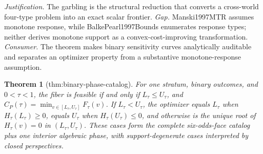 \documentclass{article}
\newtheorem{theorem}{Theorem}
\begin{document}
\par\smallskip\noindent \textit{Justification.} The garbling is the structural reduction that converts a cross-world four-type problem into an exact scalar frontier. \textit{Gap.} Manski1997MTR assumes monotone response, while BalkePearl1997Bounds enumerates response types; neither derives monotone support as a convex-cost-improving transformation. \textit{Consumer.} The theorem makes binary sensitivity curves analytically auditable and separates an optimizer property from a substantive monotone-response assumption.

\begin{theorem}[thm:binary-phase-catalog]\label{thm:binary-phase-catalog}
For one stratum, binary outcomes, and \(0<\tau<1\), the fiber is feasible if and only if \(L_\tau\leq U_\tau\), and \(C_P(\tau)=\min_{v\in[L_\tau,U_\tau]}F_\tau(v)\). If \(L_\tau<U_\tau\), the optimizer equals \(L_\tau\) when \(H_\tau(L_\tau)\geq0\), equals \(U_\tau\) when \(H_\tau(U_\tau)\leq0\), and otherwise is the unique root of \(H_\tau(v)=0\) in \((L_\tau,U_\tau)\). These cases form the complete six-odds-face catalog plus one interior algebraic phase, with support-degenerate cases interpreted by closed perspectives.
\end{theorem}
\end{document}
